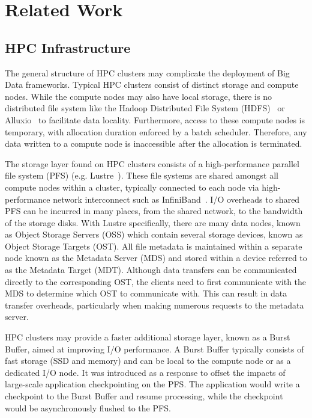 \section{Related Work}
\subsection{HPC Infrastructure}
      The general structure of HPC clusters may complicate the deployment of Big
      Data frameworks. Typical HPC clusters consist of distinct storage and
      compute nodes. While the compute nodes may also have local storage, there
      is no distributed file system like the Hadoop Distributed File System
      (HDFS)~\cite{shvachko2010hadoop} or Alluxio~\cite{alluxio} to facilitate
      data locality. Furthermore, access to these compute nodes is temporary,
      with allocation duration enforced by a batch scheduler. Therefore, any
      data written to a compute node is inaccessible after the allocation is
      terminated.

      The storage layer found on HPC clusters consists of a high-performance
      parallel file system (PFS) (e.g. Lustre~\cite{lustre}). These file systems
      are shared amongst all compute nodes within a cluster, typically connected
      to each node via high-performance network interconnect such as
      InfiniBand~\cite{infiniband}. I/O overheads to shared PFS can be incurred
      in many places, from the shared network, to the bandwidth of the storage
      disks.  With Lustre specifically, there are many data nodes, known as
      Object Storage Servers (OSS) which contain several storage devices, known
      as Object Storage Targets (OST). All file metadata is maintained within a
      separate node known as the Metadata Server (MDS) and stored within a
      device referred to as the Metadata Target (MDT). Although data transfers
      can be communicated directly to the corresponding OST, the clients need to
      first communicate with the MDS to determine which OST to communicate with.
      This can result in data transfer overheads, particularly when making
      numerous requests to the metadata server.
      
      
      HPC clusters may provide a faster additional storage layer, known as a
      Burst Buffer, aimed at improving I/O performance. A Burst Buffer typically
      consists of fast storage (SSD and memory) and can be local to the compute
      node or as a dedicated I/O node. It was introduced as a response to offset
      the impacts of large-scale application checkpointing on the PFS. The
      application would write a checkpoint to the Burst Buffer and resume
      processing, while the checkpoint would be asynchronously flushed to the
      PFS. 


